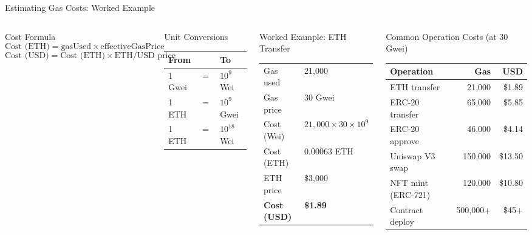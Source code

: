 \documentclass[8pt,aspectratio=169]{beamer}
\begin{document}
\begin{frame}{Estimating Gas Costs: Worked Example}
\begin{columns}
\begin{block}{Cost Formula}
\[
\text{Cost (ETH)} = \text{gasUsed} \times \text{effectiveGasPrice}
\]
\[
\text{Cost (USD)} = \text{Cost (ETH)} \times \text{ETH/USD price}
\]
\end{block}
\vspace{1mm}
\begin{block}{Unit Conversions}
\small
\begin{tabular}{@{}lcl@{}}
\toprule
\textbf{From} & & \textbf{To} \\
\midrule
1 Gwei & $=$ & $10^{9}$ Wei \\
1 ETH & $=$ & $10^{9}$ Gwei \\
1 ETH & $=$ & $10^{18}$ Wei \\
\bottomrule
\end{tabular}
\end{block}
\vspace{2mm}
\begin{alertblock}{Worked Example: ETH Transfer}
\small
\begin{tabular}{@{}ll@{}}
Gas used & 21,000 \\
Gas price & 30 Gwei \\
Cost (Wei) & $21{,}000 \times 30 \times 10^9$ \\
Cost (ETH) & $0.00063$ ETH \\
ETH price & \$3,000 \\
\textbf{Cost (USD)} & \textbf{\$1.89} \\
\end{tabular}
\end{alertblock}
\begin{block}{Common Operation Costs (at 30 Gwei)}
\small
\begin{tabular}{@{}lrr@{}}
\toprule
\textbf{Operation} & \textbf{Gas} & \textbf{USD} \\
\midrule
ETH transfer & 21,000 & \$1.89 \\
ERC-20 transfer & 65,000 & \$5.85 \\
ERC-20 approve & 46,000 & \$4.14 \\
Uniswap V3 swap & 150,000 & \$13.50 \\
NFT mint (ERC-721) & 120,000 & \$10.80 \\
Contract deploy & 500,000+ & \$45+ \\

\end{tabular}
\end{block}
\end{columns}
\end{frame}
\end{document}
